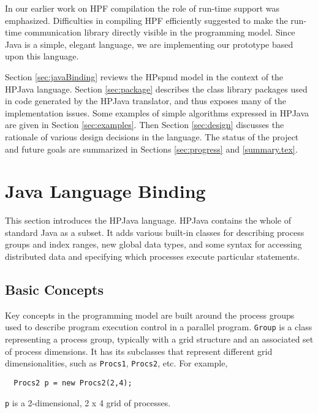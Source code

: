 In our earlier work on HPF compilation \cite{Zha97} the role of run-time
support was emphasized.  Difficulties in compiling HPF efficiently
suggested to make the run-time communication library directly visible in
the programming model.  Since Java is a simple, elegant language,
we are implementing our prototype based upon this language.

Section \ref{sec:javaBinding} reviews the HPspmd model in the context
of the HPJava language.  Section \ref{sec:package} describes the class
library packages used in code generated by the HPJava translator, and
thus exposes many of the implementation issues.  Some examples of simple
algorithms expressed in HPJava are given in Section
\ref{sec:examples}.  Then Section \ref{sec:design} discusses the
rationale of various design decisions in the language.  The status of
the project and future goals are summarized in Sections
\ref{sec:progress} and \ref{summary.tex}.



\section{Java Language Binding\label{sec:javaBinding}} 

This section introduces the HPJava language.
HPJava contains the whole of standard Java as a subset.  It adds
various built-in classes for describing process groups and index ranges,
new global data types, and some syntax for accessing distributed data
and specifying which processes execute particular statements.

\subsection{Basic Concepts}

Key concepts in the programming model are built around the 
process groups used to describe program execution control in a parallel
program.
\texttt{Group} is a class representing a process group, typically with
a grid structure and an associated set of process dimensions.
It has its subclasses that represent different grid dimensionalities,
such as \texttt{Procs1}, \texttt{Procs2}, etc. For example,
\small
\begin{verbatim}
  Procs2 p = new Procs2(2,4);
\end{verbatim}
\normalsize
{\tt p} is a 2-dimensional, 2 x 4 grid of processes.

